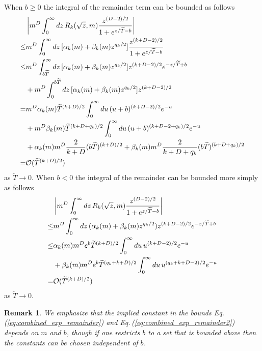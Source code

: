 \documentclass[sn-mathphys,Numbered]{sn-jnl}
\newcommand{\req}[1]{Eq.\,(\ref{#1})}
\newtheorem{remark}{Remark}
\begin{document}
When $b\geq 0$ the integral of the remainder term can be bounded as follows
\begin{align}
 &\left|m^{D}\int_0^\infty dz\, R_k(\sqrt{z},m)\frac{z^{(D-2)/2}}{1+e^{z/\widetilde{T}-b}}\right|\\
 \leq&m^{D}\int_0^\infty dz\, [\alpha_k(m)+\beta_k(m)z^{q_k/2}]\frac{z^{(k+D-2)/2}}{1+e^{z/\widetilde{T}-b}}\notag\\
 \leq &m^{D}\int_{b\widetilde{T}}^\infty dz\, [\alpha_k(m)+\beta_k(m)z^{q_k/2}]z^{(k+D-2)/2}e^{-z/\widetilde{T}+b}\notag\\
 &+m^{D}\int_0^{{b\widetilde{T}}} dz\, [\alpha_k(m)+\beta_k(m)z^{q_k/2}]z^{(k+D-2)/2}\notag\\
 =&m^{D} \alpha_k(m)\widetilde{T}^{(k+D)/2}\int_{0}^\infty du\,(u+b)^{(k+D-2)/2}e^{-u}\notag\\
 &+m^D\beta_k(m)\widetilde{T}^{(k+D+q_k)/2}\int_{0}^\infty du\,(u+b)^{(k+D-2+q_k)/2}e^{-u}\notag\\
 &+\alpha_k(m)m^{D}\frac{2}{k+D}(b\widetilde{T})^{(k+D)/2}+\beta_k(m)m^{D}\frac{2}{k+D+q_k}(b\widetilde{T})^{(k+D+q_k)/2}\notag\\
 =&\mathcal{O}(\widetilde{T}^{(k+D)/2})\label{eq:combined_exp_remainder}
\end{align}
as $\widetilde{T}\to 0$. When $b<0$ the integral of the remainder can be bounded more simply as follows
\begin{align}
 &\left|m^{D}\int_0^\infty dz\, R_k(\sqrt{z},m)\frac{z^{(D-2)/2}}{1+e^{z/\widetilde{T}-b}}\right|\\
 \leq&m^{D}\int_0^\infty dz\, (\alpha_k(m)+\beta_k(m)z^{q_k/2}) 
z^{(k+D-2)/2}e^{-z/\widetilde{T}+b}\notag\\
 \leq&\alpha_k(m)m^{D}e^b\widetilde{T}^{(k+D)/2}\int_0^\infty du\, u^{(k+D-2)/2}e^{-u}\notag\\
 &+\beta_k(m)m^{D}e^b\widetilde{T}^{(q_k+k+D)/2}\int_0^\infty du\,u^{(q_k+k+D-2)/2}e^{-u} 
\notag\\
 =&\mathcal{O}(\widetilde{T}^{(k+D)/2})\label{eq:combined_exp_remainder2}
\end{align}
as $\widetilde{T}\to 0$.
\begin{remark}\label{remark:combined_remainder_uniform_in_b}
We emphasize that the implied constant in the bounds \req{eq:combined_exp_remainder} and \req{eq:combined_exp_remainder2} depends on $m$ and $b$, though if one restricts $b$ to a set that is bounded above then the constants can be chosen independent of $b$. 
\end{remark}
\end{document}
